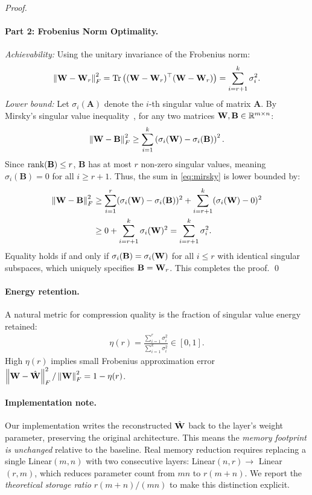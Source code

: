 \begin{proof}
\paragraph{Part 2: Frobenius Norm Optimality.}
\emph{Achievability:} Using the unitary invariance of the Frobenius norm:
\begin{equation}
  \left\|\mathbf{W} - \mathbf{W}_r\right\|_F^2 = \operatorname{Tr}\left((\mathbf{W} - \mathbf{W}_r)^\top (\mathbf{W} - \mathbf{W}_r)\right) = \sum_{i=r+1}^k \sigma_i^2.
\end{equation}
\emph{Lower bound:} Let $\sigma_i(\mathbf{A})$ denote the $i$-th singular value of matrix $\mathbf{A}$.
By Mirsky's singular value inequality~\citep{mirsky1960symmetric}, for any two matrices $\mathbf{W}, \mathbf{B} \in \mathbb{R}^{m \times n}$:
\begin{equation}
  \left\|\mathbf{W} - \mathbf{B}\right\|_F^2 \geq \sum_{i=1}^k \left(\sigma_i(\mathbf{W}) - \sigma_i(\mathbf{B})\right)^2.
  \label{eq:mirsky}
\end{equation}
Since $\operatorname{rank}(\mathbf{B}) \leq r$, $\mathbf{B}$ has at most $r$ non-zero singular values, meaning $\sigma_i(\mathbf{B}) = 0$ for all $i \geq r+1$.
Thus, the sum in \eqref{eq:mirsky} is lower bounded by:
\begin{align}
  \left\|\mathbf{W} - \mathbf{B}\right\|_F^2
  &\geq \sum_{i=1}^r (\sigma_i(\mathbf{W}) - \sigma_i(\mathbf{B}))^2 + \sum_{i=r+1}^k (\sigma_i(\mathbf{W}) - 0)^2 \nonumber\\
  &\geq 0 + \sum_{i=r+1}^k \sigma_i(\mathbf{W})^2 = \sum_{i=r+1}^k \sigma_i^2.
\end{align}
Equality holds if and only if $\sigma_i(\mathbf{B}) = \sigma_i(\mathbf{W})$ for all $i \leq r$ with identical singular subspaces, which uniquely specifies $\mathbf{B} = \mathbf{W}_r$.
This completes the proof. \qed
\end{proof}

\paragraph{Energy retention.}
A natural metric for compression quality is the fraction of singular
value energy retained:
\begin{align}
  \eta(r) = \frac{\sum_{i=1}^r \sigma_i^2}{\sum_{i=1}^k \sigma_i^2} \in [0,1].
  \label{eq:energy}
\end{align}
High $\eta(r)$ implies small Frobenius approximation error
$\left\|\mathbf{W} - \hat{\mathbf{W}}\right\|_F^2 / \left\|\mathbf{W}\right\|_F^2 = 1 - \eta(r)$.

\paragraph{Implementation note.}
Our implementation writes the reconstructed $\hat{\mathbf{W}}$ back to the layer's
weight parameter, preserving the original architecture.
This means the \emph{memory footprint is unchanged} relative to the baseline.
Real memory reduction requires replacing a single Linear$(m, n)$ with two
consecutive layers: Linear$(n, r) \to$ Linear$(r, m)$, which reduces
parameter count from $mn$ to $r(m+n)$.
We report the \emph{theoretical storage ratio} $r(m+n)/(mn)$ to make
this distinction explicit.

